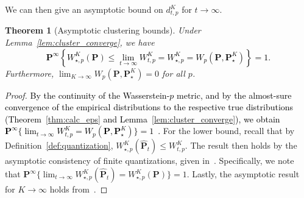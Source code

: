 \documentclass[12pt]{article}
\newcommand{\prob}{{\mathbf P}}
\newcommand{\barp}{p}
\newcommand{\ld}{W}
\newtheorem{theorem}{Theorem}[section]  %
\newcommand{\RC}[1]{\textcolor{black}{#1}}
\newcommand{\RC}[1]{\textcolor{blue}{#1}}
\begin{document}
\ifpreprint
We can then give an asymptotic bound on $d^K_{t,p} $ for $t\to\infty$.
\fi
\begin{theorem}[Asymptotic clustering bounds]
\label{thm:clustering_conv}
Under Lemma~\ref{lem:cluster_converge}, we have
\RC{$$
\mathbf{P}^\infty\left\{  \ld^K_{\star,\barp}(\prob) \leq \lim_{t \rightarrow \infty }  \ld^K_{t,\barp} = \ld^K_{\star,\barp} = W_{\barp}(\prob,\prob^K_\star)\right\} = 1.
$$} 
Furthermore,
     $\lim_{K \rightarrow \infty} W_{\barp}(\prob,\prob^K_\star) = 0$ for all $\barp$.
\end{theorem}
\begin{proof}
\RC{By the continuity of the Wasserstein-$\barp$ metric, and by the almost-sure convergence of the empirical distributions to the respective true distributions (Theorem~\ref{thm:calc_eps} and Lemma~\ref{lem:cluster_converge}), we obtain $\mathbf{P}^\infty\{ \lim_{t \rightarrow \infty } \ld^K_{t,\barp}   = W_{\barp}(\prob,\prob^K_\star)\} = 1$~\cite[Theorem 7.12]{Villani2003Topics}.}
%
For the lower bound, recall that by Definition~\ref{def:quantization},
$ \ld^K_{\star,\barp}(\hat{\prob}_t) \leq \ld^K_{t,\barp} . $
The result then holds by the asymptotic consistency of finite quantizations, given in~\cite[Corollary 4.24]{quantization}.
Specifically,
we note that
$ \mathbf{P}^\infty\{ \lim_{t \rightarrow \infty }  \ld^K_{\star,\barp}(\hat{\prob}_t) =  \ld^K_{\star,\barp}(\prob)\} = 1.
$
Lastly, the asymptotic result for $K \to \infty $ holds from~\cite[Lemma 6.1]{quantization}.
\end{proof}
\end{document}
